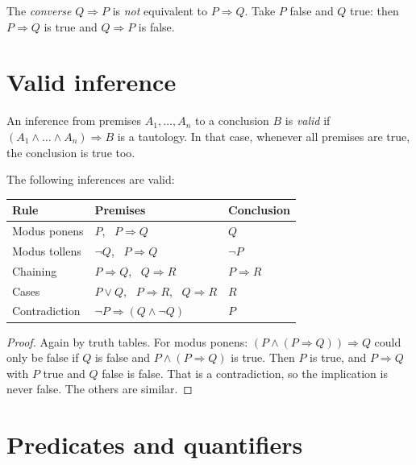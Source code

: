 \begin{remark}
The \emph{converse} $Q \Rightarrow P$ is \emph{not} equivalent to $P \Rightarrow
Q$. Take $P$ false and $Q$ true: then $P \Rightarrow Q$ is true and $Q \Rightarrow
P$ is false.
\end{remark}

\section{Valid inference}

\begin{definition}
\label{def:valid}
An inference from premises $A_1, \dots, A_n$ to a conclusion $B$ is \emph{valid}
if $(A_1 \land \dots \land A_n) \Rightarrow B$ is a tautology. In that case,
whenever all premises are true, the conclusion is true too.
\end{definition}

\begin{theorem}
\label{thm:inference}
The following inferences are valid:
\begin{center}
\begin{tabular}{@{}lll@{}}
  \toprule
  Rule & Premises & Conclusion \\
  \midrule
  Modus ponens & $P$, \ $P \Rightarrow Q$ & $Q$ \\
  Modus tollens & $\lnot Q$, \ $P \Rightarrow Q$ & $\lnot P$ \\
  Chaining & $P \Rightarrow Q$, \ $Q \Rightarrow R$ & $P \Rightarrow R$ \\
  Cases & $P \lor Q$, \ $P \Rightarrow R$, \ $Q \Rightarrow R$ & $R$ \\
  Contradiction & $\lnot P \Rightarrow (Q \land \lnot Q)$ & $P$ \\
  \bottomrule
\end{tabular}
\end{center}
\end{theorem}

\begin{proof}
Again by truth tables. For modus ponens: $(P \land (P \Rightarrow Q)) \Rightarrow
Q$ could only be false if $Q$ is false and $P \land (P \Rightarrow Q)$ is true.
Then $P$ is true, and $P \Rightarrow Q$ with $P$ true and $Q$ false is false. That
is a contradiction, so the implication is never false. The others are similar.
\end{proof}

\section{Predicates and quantifiers}
\label{sec:quantifiers}


